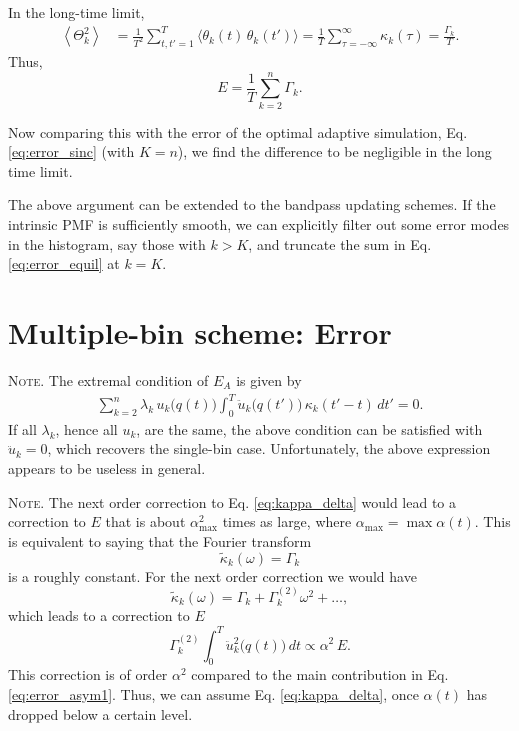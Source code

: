 \documentclass[preprint, floatfix]{revtex4-1}
\newcommand{\note}[1]{{\color{DarkGreen}\footnotesize \textsc{Note.} #1}}
\newcommand{\Err}{E}
\begin{document}
In the long-time limit,
\begin{align*}
  \left\langle
    \Theta_k^2
  \right\rangle
  &=
  \frac{1}{T^2}
  \sum_{ t, t' = 1 }^T
  \langle \theta_k(t) \, \theta_k(t') \rangle
  =
  \frac{1}{T}
  \sum_{\tau = -\infty}^\infty
    \kappa_k(\tau)
  =
  \frac{ \Gamma_k }{ T }
.
\end{align*}
%
Thus,
\begin{equation}
  E
  =
  \frac{ 1 } { T }
  \sum_{ k = 2 }^n \Gamma_k
  .
\label{eq:error_equil}
\end{equation}

Now comparing this with the error of
the optimal adaptive simulation,
Eq. \eqref{eq:error_sinc} (with $K = n$),
we find the difference to be negligible
in the long time limit.

The above argument can be extended
to the bandpass updating schemes.
%
If the intrinsic PMF is sufficiently smooth,
we can explicitly filter out some error modes
in the histogram,
say those with $k >  K$,
and truncate the sum in
Eq. \eqref{eq:error_equil} at $k = K$.








\section{Multiple-bin scheme: Error}



\note{The extremal condition of $\Err_A$ is given by
%
\begin{align}
  \sum_{k = 2}^n
  \lambda_k \, u_k\bigl( q(t) \bigr)
  \int_0^T
    \ddot u_k \bigl( q(t') \bigr) \,
    \kappa_k(t' - t) \, dt' = 0.
  \tag{N1}
\label{eq:optimal_mbin}
\end{align}
%
If all $\lambda_k$, hence all $u_k$, are the same,
the above condition can be satisfied with $\ddot u_k = 0$,
which recovers the single-bin case.
%
Unfortunately, the above expression
appears to be useless in general.
}


\note{The next order correction to Eq. \eqref{eq:kappa_delta}
would lead to a correction to $\Err$
that is about $\alpha_{\max}^2$ times as large,
where $\alpha_{\max} = \max \alpha(t)$.
%
This is equivalent to saying that the Fourier transform
  $$
  \tilde \kappa_k(\omega) = \Gamma_k
  $$
  is a roughly constant.
  For the next order correction we would have
  $$
  \tilde \kappa_k(\omega) = \Gamma_k + \Gamma^{(2)}_k \omega^2 + \dots,
  $$
  which leads to a correction to $\Err$
  $$
  \Gamma^{(2)}_k
  \int_0^T \ddot u_k^2\bigl( q(t) \bigr) \, dt
  \propto
  \alpha^2 \, \Err.
  $$
  This correction is of order $\alpha^2$
  compared to the main contribution in Eq. \eqref{eq:error_asym1}.
  Thus, we can assume Eq. \eqref{eq:kappa_delta},
  once $\alpha(t)$ has dropped below a certain level.
}%
\end{document}
